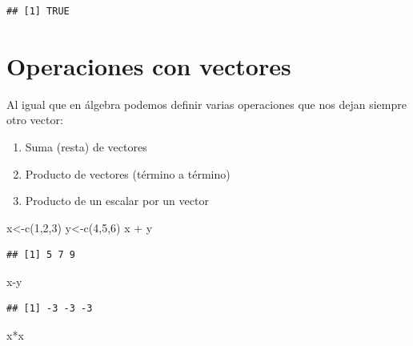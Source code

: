 \documentclass[
]{book}
\newenvironment{Shaded}{\begin{snugshade}}{\end{snugshade}}
\newcommand{\DecValTok}[1]{\textcolor[rgb]{0.00,0.00,0.81}{#1}}
\newcommand{\FunctionTok}[1]{\textcolor[rgb]{0.00,0.00,0.00}{#1}}
\newcommand{\NormalTok}[1]{#1}
\newcommand{\OtherTok}[1]{\textcolor[rgb]{0.56,0.35,0.01}{#1}}
\newcommand{\SpecialCharTok}[1]{\textcolor[rgb]{0.00,0.00,0.00}{#1}}
\providecommand{\tightlist}{%
  \setlength{\itemsep}{0pt}\setlength{\parskip}{0pt}}
\begin{document}
\begin{verbatim}
## [1] TRUE
\end{verbatim}

\hypertarget{operaciones-con-vectores}{%
\section{Operaciones con vectores}\label{operaciones-con-vectores}}

Al igual que en álgebra podemos definir varias operaciones que nos dejan siempre otro vector:

\begin{enumerate}
\def\labelenumi{\arabic{enumi}.}
\tightlist
\item
  Suma (resta) de vectores
\item
  Producto de vectores (término a término)
\item
  Producto de un escalar por un vector
\end{enumerate}

\begin{Shaded}
\begin{Highlighting}[]
\NormalTok{x}\OtherTok{\textless{}{-}}\FunctionTok{c}\NormalTok{(}\DecValTok{1}\NormalTok{,}\DecValTok{2}\NormalTok{,}\DecValTok{3}\NormalTok{)}
\NormalTok{y}\OtherTok{\textless{}{-}}\FunctionTok{c}\NormalTok{(}\DecValTok{4}\NormalTok{,}\DecValTok{5}\NormalTok{,}\DecValTok{6}\NormalTok{)}
\NormalTok{x }\SpecialCharTok{+}\NormalTok{ y }
\end{Highlighting}
\end{Shaded}

\begin{verbatim}
## [1] 5 7 9
\end{verbatim}

\begin{Shaded}
\begin{Highlighting}[]
\NormalTok{x}\SpecialCharTok{{-}}\NormalTok{y}
\end{Highlighting}
\end{Shaded}

\begin{verbatim}
## [1] -3 -3 -3
\end{verbatim}

\begin{Shaded}
\begin{Highlighting}[]
\NormalTok{x}\SpecialCharTok{*}\NormalTok{x}
\end{Highlighting}
\end{Shaded}
\end{document}
